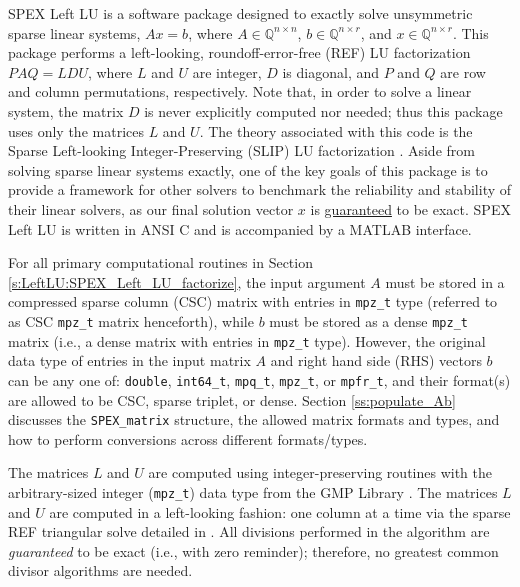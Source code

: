 \documentclass[12pt]{report}
\theoremstyle{definition}
\begin{document}
SPEX Left LU is a software package designed to exactly solve unsymmetric sparse
linear systems, $ A x = b$, where $A \in \mathbb{Q}^{n \times
n}$, $b \in \mathbb{Q}^{n \times r}$, and $x \in \mathbb{Q}^{n \times
r}$. This package performs a left-looking, roundoff-error-free (REF) LU
factorization $P A Q = L D U$, where $L$ and $U$ are integer, $D$ is diagonal,
and $P$ and $Q$ are row and column permutations, respectively. 
Note that, in order to solve a linear system, the matrix $D$ is never explicitly computed nor needed; thus this 
package uses only the matrices $L$ and $U$. The theory associated with this code is the Sparse Left-looking Integer-Preserving (SLIP) LU factorization
 \cite{lourenco2019exact}. Aside from
solving sparse linear systems exactly, one of the key goals of this package is
to provide a framework for other solvers to benchmark the reliability and
stability of their linear solvers, as our final solution vector $x$ is
\ul{guaranteed} to be exact. SPEX Left LU is written in ANSI C and is accompanied by a MATLAB interface.

For all primary computational routines in Section \ref{s:LeftLU:SPEX_Left_LU_factorize}, the input
argument $A$ must be stored in a compressed sparse column (CSC) matrix with
entries in \verb|mpz_t| type (referred to as CSC \verb|mpz_t| matrix henceforth), while $b$ must be stored as a dense \verb|mpz_t| matrix (i.e., a
dense matrix with entries in \verb|mpz_t| type).  However, the original data type of entries in the input matrix $A$ and right hand side (RHS) vectors $b$ can be any one of: \verb|double|, \verb|int64_t|, \verb|mpq_t|,
\verb|mpz_t|, or \verb|mpfr_t|, and their format(s) are allowed to be 
CSC, sparse triplet, or dense. Section \ref{ss:populate_Ab} discusses the \verb|SPEX_matrix| structure, the allowed matrix formats and types, and how to perform conversions across different formats/types.

The matrices $L$ and $U$ are computed using integer-preserving
routines with the arbitrary-sized integer (\verb|mpz_t|) data type from the GMP Library
\cite{granlund2015gnu}. The matrices $L$ and $U$ are computed in a left-looking fashion: one column at a
time via the sparse REF triangular solve
detailed in \cite{lourenco2019exact}. All divisions performed in the algorithm
are \textit{guaranteed} to be exact (i.e., with zero reminder); therefore, no greatest common
divisor algorithms are needed.
\end{document}
